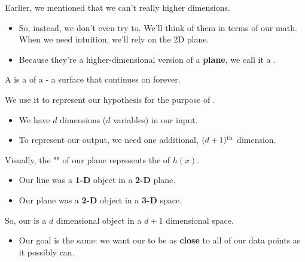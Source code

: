         Earlier, we mentioned that we can't really  higher dimensions.
        
        \begin{itemize}
            \item So, instead, we don't even try to. We'll think of them in terms of our math. When we need intuition, we'll rely on the 2D plane.
            \item Because they're a higher-dimensional version of a \textbf{plane}, we call it a .\\
        \end{itemize}
        
        \begin{definition}
            A  is a  of a  - a  surface that continues on forever.
            
            We use it to represent our  hypothesis for the purpose of . 

            \begin{itemize}
                \item We have $d$ dimensions ($d$ variables) in our input.
                \item To represent our output, we need one additional, $(d+1)^{ \text{th} }$ dimension.
            \end{itemize}

            Visually, the "" of our plane represents the  of $h(x)$.
        \end{definition}

        \begin{itemize}
            \item Our line was a \textbf{1-D} object in a \textbf{2-D} plane.
            \item Our plane was a \textbf{2-D} object in a \textbf{3-D} space.
        \end{itemize}
        
        So, our  is a $d$ dimensional object in a $d+1$ dimensional space.

        \begin{itemize}
            \item Our goal is the same: we want our  to be as \textbf{close} to all of our data points as it possibly can.
        \end{itemize}

